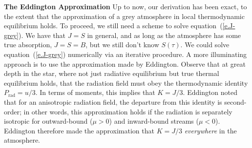 \textbf{The Eddington Approximation}
Up to now, our derivation has been exact, to the extent that the approximation of a grey atmosphere in local thermodynamic equilibrium holds. To proceed, we still need a scheme to solve equation~(\ref{e.J-grey}). We have that $J = S$ in general, and as long as the atmosphere has some true absorption, $J = S = B$, but we still don't know $S(\tau)$. We could solve equation~(\ref{e.J-grey}) numerically via an iterative procedure. A more illuminating approach is to use the approximation made by Eddington. Observe that at great depth in the star, where not just radiative equilibrium but true thermal equilibrium holds, that the radiation field must obey the thermodynamic identity $P_{\mathrm{rad}} = u/3$. In terms of moments, this implies that $K = J/3$. Eddington noted that for an anisotropic radiation field, the departure from this identity is second-order; in other words, this approximation holds if the radiation is separately isotropic for outward-bound ($\mu > 0$) and inward-bound streams ($\mu < 0$).  Eddington therefore made the approximation that $K = J/3$ \emph{everywhere} in the atmosphere.

